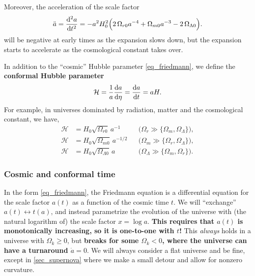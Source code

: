 \documentclass[10pt,a4paper]{article}
\begin{document}
Moreover, the acceleration of the scale factor
\begin{equation}
	\ddot{a} = \odv[2]{a}{t} = -a^2 H_0^2 \Big( 2 \, \Omega_{r0} a^{-4} + \Omega_{m0} a^{-3} - 2 \, \Omega_{\Lambda0} \Big).
\label{eq_acceleration}
\end{equation}
will be negative at early times as the expansion slows down,
but the expansion starts to accelerate as the cosmological constant takes over.

In addition to the ``cosmic'' Hubble parameter \eqref{eq_friedmann},
we define the \textbf{conformal Hubble parameter}
\begin{equation}
	\mathcal{H} = \frac1a \odv{a}{\eta} = \odv{a}{t} = a H.
\label{eq_conformal_hubble}
\end{equation}
For example, in universes dominated by radiation, matter and the cosmological constant,
we have,
\begin{subequations}
\begin{align}
	\mathcal{H} &= H_0 \sqrt{\Omega_{r0}} \, a^{-1} && \Big( \Omega_r \gg \{\Omega_m,\Omega_\Lambda\} \Big), \label{eq_conformal_hubble_dominated_radiation} \\
	\mathcal{H} &= H_0 \sqrt{\Omega_{m0}} \, a^{-1/2} && \Big( \Omega_m \gg \{\Omega_r,\Omega_\Lambda\} \Big), \\
	\mathcal{H} &= H_0 \sqrt{\Omega_{\Lambda0}} \, a && \Big( \Omega_\Lambda \gg \{\Omega_m,\Omega_r\} \Big).
\end{align}
\label{eq_conformal_hubble_dominated}
\end{subequations}

\subsubsection*{Cosmic and conformal time}

In the form \eqref{eq_friedmann},
the Friedmann equation is a differential equation for the scale factor $a(t)$
as a function of the cosmic time $t$.
We will ``exchange'' $a(t) \leftrightarrow t(a)$, and instead parametrize the evolution of the universe with (the natural logarithm of) the scale factor $x = \log a$.
\textbf{This requires that $a(t)$ is monotonically increasing, so it is one-to-one with $t$!}
This \emph{always} holds in a universe with $\Omega_{k} \geq 0$,
but \textbf{breaks for some $\Omega_{k} < 0$, where the universe can have a turnaround $\dot{a} = 0$}.
We will always consider a flat universe and be fine,
except in \cref{sec_supernova} where we make a small detour and allow for nonzero curvature.
\end{document}
